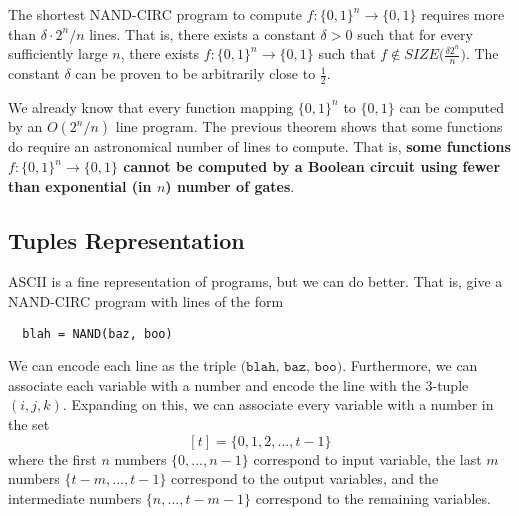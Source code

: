   \begin{theorem}
  The shortest NAND-CIRC program to compute $f: \{0,1\}^n \longrightarrow \{0,1\}$ requires more than $\delta \cdot 2^n / n$ lines. That is, there exists a constant $\delta > 0$ such that for every sufficiently large $n$, there exists $f: \{0,1\}^n \longrightarrow \{0,1\}$ such that $f \not\in SIZE\Big( \frac{\delta 2^n}{n}\Big)$. The constant $\delta$ can be proven to be arbitrarily close to $\frac{1}{2}$. 
  \end{theorem}

  We already know that every function mapping $\{0,1\}^n$ to $\{0,1\}$ can be computed by an $O(2^n / n)$ line program. The previous theorem shows that some functions do require an astronomical number of lines to compute. That is, \textbf{some functions $f: \{0,1\}^n \longrightarrow \{0,1\}$ cannot be computed by a Boolean circuit using fewer than exponential (in $n$) number of gates}. 

\subsection{Tuples Representation}

  ASCII is a fine representation of programs, but we can do better. That is, give a NAND-CIRC program with lines of the form 
  \begin{lstlisting}
  blah = NAND(baz, boo)
  \end{lstlisting}
  We can encode each line as the triple $\texttt{(blah, baz, boo)}$. Furthermore, we can associate each variable with a number and encode the line with the 3-tuple $(i, j, k)$. Expanding on this, we can associate every variable with a number in the set
  \[[t] = \{0, 1, 2, ..., t-1\}\]
  where the first $n$ numbers $\{0, ..., n-1\}$ correspond to input variable, the last $m$ numbers $\{t-m, ..., t-1\}$ correspond to the output variables, and the intermediate numbers $\{n, ..., t-m-1\}$ correspond to the remaining variables. 


